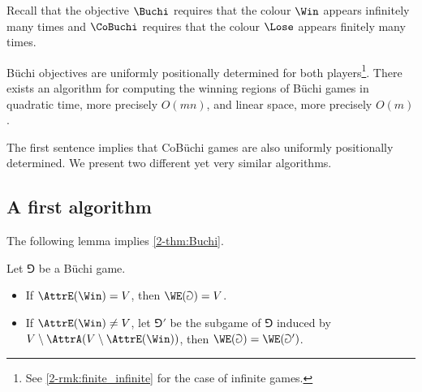 Recall that the objective $\Buchi$ requires that the colour $\Win$ appears infinitely many times
and $\CoBuchi$ requires that the colour $\Lose$ appears finitely many times.

\begin{theorem}
\label{2-thm:Buchi}
B{\"u}chi objectives are uniformly positionally determined for both players\footnote{See \cref{2-rmk:finite_infinite} for the case of infinite games.}.
There exists an algorithm for computing the winning regions of B{\"u}chi games in quadratic time, more precisely $O(mn)$,
and linear space, more precisely $O(m)$.
\end{theorem}
The first sentence implies that CoB{\"u}chi games are also uniformly positionally determined.
We present two different yet very similar algorithms. 

\subsection*{A first algorithm}
The following lemma implies \cref{2-thm:Buchi}.

\begin{lemma}
\label{2-lem:Buchi_second}
Let $\Game$ be a B{\"u}chi game.
\begin{itemize}
	\item If $\AttrE(\Win) = V$, then $\WE(\Game) = V$.
	\item If $\AttrE(\Win) \neq V$, 
	let $\Game'$ be the subgame of $\Game$ induced by $V \setminus \AttrA( V \setminus \AttrE(\Win) )$,
	then $\WE(\Game) = \WE(\Game')$.	
\end{itemize}
\end{lemma}

